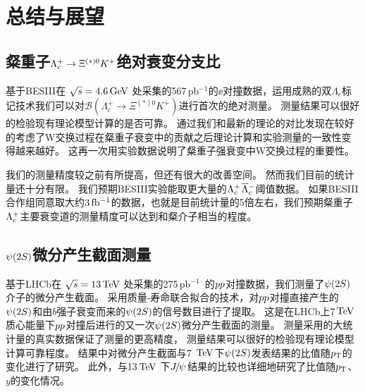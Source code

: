\chapter{总结与展望}
\label{chap:summary}

\section{粲重子$\Lambda_{c}^{+}\rightarrow \Xi^{(*)0}K^{+}$绝对衰变分支比}

基于BESIII在 $\sqrt{s}=4.6\mathrm{\,Ge\kern -0.1em V}$ 处采集的567\,pb$^{-1}$的$\ee$对撞数据，运用成熟的双$\Lambda_{c}$标记技术我们可以对$\mathcal{B}(\Lambda^+_c\to \Xi^{(*)0}K^+)$进行首次的绝对测量。
测量结果可以很好的检验现有理论模型计算的是否可靠。
通过我们和最新的理论的对比发现在较好的考虑了W交换过程在粲重子衰变中的贡献之后理论计算和实验测量的一致性变得越来越好。
这再一次用实验数据说明了粲重子强衰变中W交换过程的重要性。

我们的测量精度较之前有所提高，但还有很大的改善空间。
然而我们目前的统计量还十分有限。
我们预期BESIII实验能取更大量的$\Lambda_{c}^{+}$$\overline{\Lambda}{}_{c}^{-}$阈值数据。
如果BESIII合作组同意取大约$3\, \rm{fb^{-1}}$的数据，也就是目前统计量的5倍左右，我们预期粲重子$\Lambda_{c}^{+}$主要衰变道的测量精度可以达到和粲介子相当的程度。

\section{${\psi{(2S)}}$微分产生截面测量}

基于LHCb在 $\sqrt{s}=13\mathrm{\,Te\kern -0.1em V}$ 处采集的275\,pb$^{-1}$~的${pp}$对撞数据，我们测量了${\psi{(2S)}}$介子的微分产生截面。
采用质量-寿命联合拟合的技术，对${pp}$对撞直接产生的${\psi{(2S)}}$和由$b$强子衰变而来的${\psi{(2S)}}$的信号数目进行了提取。
这是在LHCb上7$\mathrm{\,Te\kern -0.1em V}$质心能量下${pp}$对撞后进行的又一次${\psi{(2S)}}$微分产生截面的测量。
测量采用的大统计量的真实数据保证了测量的更高精度，
测量结果可以很好的检验现有理论模型计算可靠程度。
结果中对微分产生截面与7 $\mathrm{\,Te\kern -0.1em V}$下${\psi{(2S)}}$发表结果的比值随$\mbox{$p_{\mathrm{ T}}$}$的变化进行了研究。
此外，与13$\mathrm{\,Te\kern -0.1em V}$ 下${{J\mskip -3mu/\mskip -2mu\psi\mskip 2mu}}$结果的比较也详细地研究了比值随$\mbox{$p_{\mathrm{ T}}$}$、$y$的变化情况。

